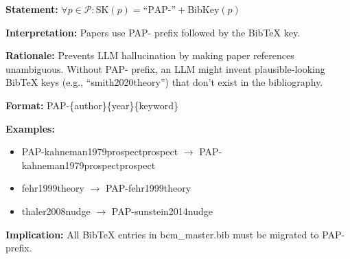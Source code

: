 \begin{tcolorbox}[colback=gray!5!white, colframe=gray!75!black,
    title=Axiom UNMAPPED_SK-9: Paper Exception]
\textbf{Statement:} $\forall p \in \mathcal{P}: \text{SK}(p) = \text{``PAP-''} + \text{BibKey}(p)$

\textbf{Interpretation:} Papers use PAP- prefix followed by the BibTeX key.

\textbf{Rationale:} Prevents LLM hallucination by making paper references unambiguous.
Without PAP- prefix, an LLM might invent plausible-looking BibTeX keys (e.g.,
``smith2020theory'') that don't exist in the bibliography.

\textbf{Format:} PAP-\{author\}\{year\}\{keyword\}

\textbf{Examples:}
\begin{itemize}[nosep]
\item PAP-kahneman1979prospectprospect $\rightarrow$ PAP-kahneman1979prospectprospect
\item fehr1999theory $\rightarrow$ PAP-fehr1999theory
\item thaler2008nudge $\rightarrow$ PAP-sunstein2014nudge
\end{itemize}

\textbf{Implication:} All BibTeX entries in bcm\_master.bib must be migrated to PAP- prefix.
\end{tcolorbox}

